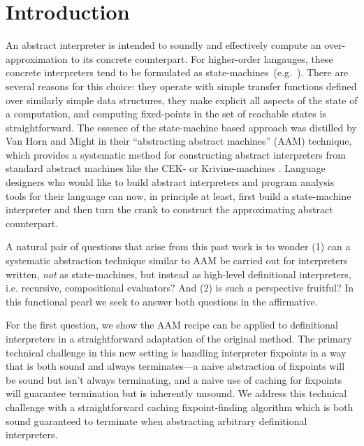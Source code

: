 \section{Introduction}

An abstract interpreter is intended to soundly and effectively compute
an over-approximation to its concrete counterpart.  For higher-order
langauges, these concrete interpreters tend to be formulated as
state-machines~(e.g.~\cite{dvanhorn:jagannathan-weeks-popl95,
  dvanhorn:jagannathan-etal-popl98, 
  dvanhorn:wright-jagannathan-toplas98,
  dvanhorn:Might:2006:DeltaCFA,
  dvanhorn:midtgaard-jensen-sas-08,
  dvanhorn:Midtgaard2009Controlflow,
  dvanhorn:Might2011Family, dvanhorn:Sergey2013Monadic}).  There are
several reasons for this choice: they operate with simple transfer
functions defined over similarly simple data structures, they make
explicit all aspects of the state of a computation, and computing
fixed-points in the set of reachable states is straightforward.
%
The essence of the state-machine based approach was distilled by Van
Horn and Might in their ``abstracting abstract machines'' (AAM)
technique, which provides a systematic method for constructing
abstract interpreters from standard abstract machines like the CEK- or
Krivine-machines \cite{dvanhorn:VanHorn2010Abstracting}.  Language
designers who would like to build abstract interpreters and program
analysis tools for their language can now, in principle at least,
first build a state-machine interpreter and then turn the crank to
construct the approximating abstract counterpart.

A natural pair of questions that arise from this past work is to wonder
(1) can a systematic abstraction technique similar to AAM  be
carried out for interpreters written, \emph{not} as state-machines,
but instead as high-level definitional interpreters, i.e. recursive,
compositional evaluators? And (2) is such a perspective fruitful?  In
this functional pearl we seek to answer both questions in the
affirmative.

For the first question, we show the AAM recipe can be applied
to definitional interpreters in a straightforward adaptation of the
original method. The primary technical challenge in this new setting
is handling interpreter fixpoints in a way that is both sound and
always terminates---a naive abstraction of fixpoints will be sound but
isn't always terminating, and a naive use of caching for fixpoints
will guarantee termination but is inherently unsound. We address this
technical challenge with a straightforward caching fixpoint-finding
algorithm which is both sound guaranteed to terminate when abstracting
arbitrary definitional interpreters.

